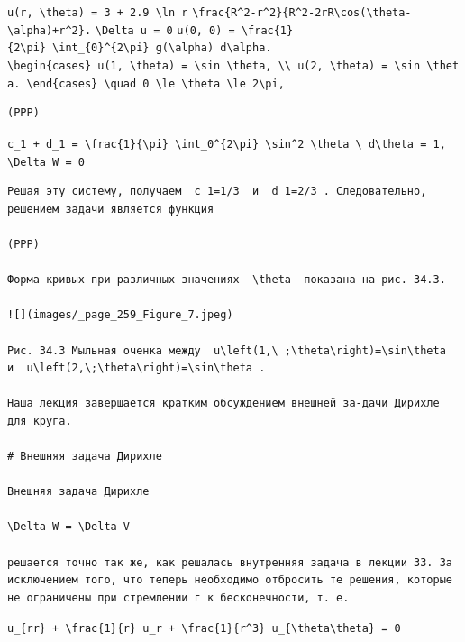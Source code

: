 \documentclass[
  ukrainian,
]{article}
\begin{document}
\texttt{u(r,\ \textbackslash{}theta)\ =\ 3\ +\ 2.9\ \textbackslash{}ln\ r}
\texttt{\textbackslash{}frac\{R\^{}2-r\^{}2\}\{R\^{}2-2rR\textbackslash{}cos(\textbackslash{}theta-\textbackslash{}alpha)+r\^{}2\}.}
\texttt{\textbackslash{}Delta\ u\ =\ 0}
\texttt{u(0,\ 0)\ =\ \textbackslash{}frac\{1\}\{2\textbackslash{}pi\}\ \textbackslash{}int\_\{0\}\^{}\{2\textbackslash{}pi\}\ g(\textbackslash{}alpha)\ d\textbackslash{}alpha.}
\texttt{\textbackslash{}begin\{cases\}\ u(1,\ \textbackslash{}theta)\ =\ \textbackslash{}sin\ \textbackslash{}theta,\ \textbackslash{}\textbackslash{}\ u(2,\ \textbackslash{}theta)\ =\ \textbackslash{}sin\ \textbackslash{}theta.\ \textbackslash{}end\{cases\}\ \textbackslash{}quad\ 0\ \textbackslash{}le\ \textbackslash{}theta\ \textbackslash{}le\ 2\textbackslash{}pi,}

\begin{verbatim}
(PPP)
\end{verbatim}

\texttt{c\_1\ +\ d\_1\ =\ \textbackslash{}frac\{1\}\{\textbackslash{}pi\}\ \textbackslash{}int\_0\^{}\{2\textbackslash{}pi\}\ \textbackslash{}sin\^{}2\ \textbackslash{}theta\ \textbackslash{}\ d\textbackslash{}theta\ =\ 1,}
\texttt{\textbackslash{}Delta\ W\ =\ 0}

\begin{verbatim}
Решая эту систему, получаем  c_1=1/3  и  d_1=2/3 . Следовательно, решением задачи является функция

(PPP)

Форма кривых при различных значениях  \theta  показана на рис. 34.3.

![](images/_page_259_Figure_7.jpeg)

Рис. 34.3 Мыльная оченка между  u\left(1,\ ;\theta\right)=\sin\theta  и  u\left(2,\;\theta\right)=\sin\theta .

Наша лекция завершается кратким обсуждением внешней за-дачи Дирихле для круга.

# Внешняя задача Дирихле

Внешняя задача Дирихле

\Delta W = \Delta V

решается точно так же, как решалась внутренняя задача в лекции 33. За исключением того, что теперь необходимо отбросить те решения, которые не ограничены при стремлении г к бесконечности, т. е.
\end{verbatim}

\texttt{u\_\{rr\}\ +\ \textbackslash{}frac\{1\}\{r\}\ u\_r\ +\ \textbackslash{}frac\{1\}\{r\^{}3\}\ u\_\{\textbackslash{}theta\textbackslash{}theta\}\ =\ 0}
\end{document}
